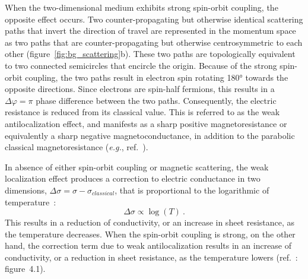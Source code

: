 When the two-dimensional medium exhibits strong spin-orbit coupling, the opposite effect occurs. Two counter-propagating but otherwise identical scattering paths that invert the direction of travel are represented in the momentum space as two paths that are counter-propagating but otherwise centrosymmetric to each other (figure~\ref{fig:bg_scattering}b). These two paths are topologically equivalent to two connected semicircles that encircle the origin. Because of the strong spin-orbit coupling, the two paths result in electron spin rotating \ang{180} towards the opposite directions. Since electrons are spin-half fermions, this results in a $\Delta\varphi=\pi$ phase difference between the two paths. Consequently, the electric resistance is reduced from its classical value. This is referred to as the weak antilocalization effect, and manifests as a sharp positive magnetoresistance or equivalently a sharp negative magnetoconductance, in addition to the parabolic classical magnetoresistance (\textit{e.g.}, ref.~\cite{TI_WAL_Hongkong}).

In absence of either spin-orbit coupling or magnetic scattering, the weak localization effect produces a correction to electric conductance in two dimensions, $\Delta\sigma = \sigma - \sigma_{classical}$, that is proportional to the logarithmic of temperature~\cite{anderson1979, dolan1979}:%
\begin{equation}\label{eq:wl_T}
    \Delta\sigma \propto \log(T)~.
\end{equation}%
This results in a reduction of conductivity, or an increase in sheet resistance, as the temperature decreases. When the spin-orbit coupling is strong, on the other hand, the correction term due to weak antilocalization results in an increase of conductivity, or a reduction in sheet resistance, as the temperature lowers (ref.~\cite{bergmann1984}: figure~4.1).

